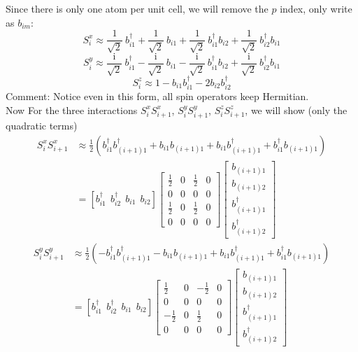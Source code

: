 \documentclass[letter]{article}
\newcommand{\ii}{\mathrm{i}}
\begin{document}
Since there is only one atom per unit cell, we will remove the $p$ index, only write as $b_{im}$:
$$
S_{i}^{x}\approx\frac{1}{\sqrt{2}}\ b_{i1}^{\dagger}+\frac{1}{\sqrt{2}}\ b_{i1}+\frac{1}{\sqrt{2}}\  b_{i1}^{\dagger}b_{i2}+\frac{1}{\sqrt{2}}\  b_{i2}^{\dagger}b_{i1}$$$$
S_{i}^{y}\approx\frac{\ii}{\sqrt{2}}\ b_{i1}^{\dagger}-\frac{\ii}{\sqrt{2}}\ b_{i1}-\frac{\ii}{\sqrt{2}}\ b_{i1}^{\dagger}b_{i2}+\frac{\ii}{\sqrt{2}}\ b_{i2}^{\dagger}b_{i1}$$$$
S_{i}^{z}\approx1-b_{i1}b_{i1}^{\dagger}-2b_{i2}b_{i2}^{\dagger}$$
\indent Comment: Notice even in this form, all spin operators keep Hermitian.\\
\indent Now For the three interactions $S_{i}^x S_{i+1}^x$, $S_{i}^y S_{i+1}^y$, $S_{i}^z S_{i+1}^z$, we will show (only the quadratic terms)
$$
\begin{aligned}
    S_{i}^x S_{i+1}^x &\approx\frac{1}{2}\left(b_{i1}^{\dagger}b_{(i+1)1}^{\dagger}+b_{i1}b_{(i+1)1}+b_{i1}b_{(i+1)1}^{\dagger}+b_{i1}^{\dagger}b_{(i+1)1}\right)\\ &=\left[
        b_{i1}^{\dagger} \ \ 
        b_{i2}^{\dagger}\  \ 
        b_{i1}\ \ 
        b_{i2}\right]
       \begin{bmatrix}
            \frac{1}{2} & 0 & \frac{1}{2} & 0 \\
           0 &  0 & 0 &0 \\
           \frac{1}{2} &  0 & \frac{1}{2} &0\\
            0 & 0 & 0& 0
            \end{bmatrix}\begin{bmatrix}
                b_{(i+1)1}  \\
                b_{(i+1)2}  \\
                b_{(i+1)1}^{\dagger}\\
                b_{(i+1)2}^{\dagger}
                \end{bmatrix}
\end{aligned}
$$
$$
\begin{aligned}
    S_{i}^y S_{i+1}^y &\approx\frac{1}{2}\left(-b_{i1}^{\dagger}b_{(i+1)1}^{\dagger}-b_{i1}b_{(i+1)1}+b_{i1}b_{(i+1)1}^{\dagger}+b_{i1}^{\dagger}b_{(i+1)1}\right)\\ &=\left[
        b_{i1}^{\dagger} \ \ 
        b_{i2}^{\dagger}\  \ 
        b_{i1}\ \ 
        b_{i2}\right]
        \begin{bmatrix}
            \frac{1}{2} & 0 & -\frac{1}{2} & 0 \\
           0 &  0 & 0 &0 \\
           -\frac{1}{2} &  0 & \frac{1}{2} &0\\
            0 & 0 & 0& 0
            \end{bmatrix}\begin{bmatrix}
                b_{(i+1)1}  \\
                b_{(i+1)2}  \\
                b_{(i+1)1}^{\dagger}\\
                b_{(i+1)2}^{\dagger}
                \end{bmatrix}
\end{aligned}
$$
\end{document}
